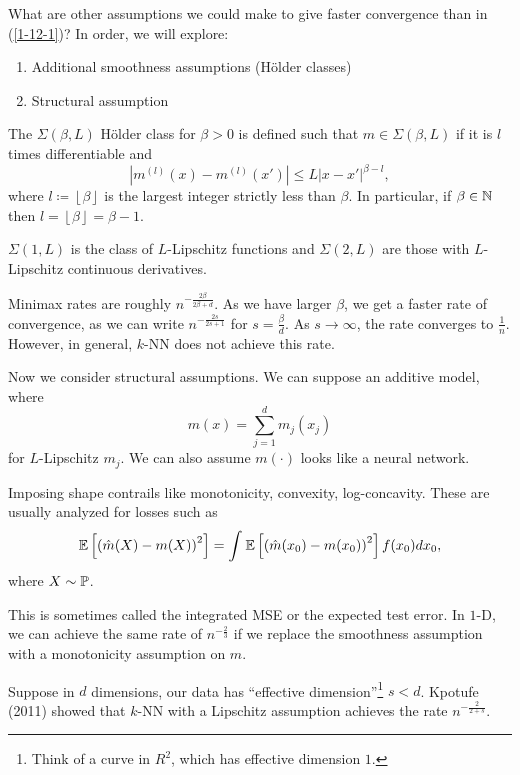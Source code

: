 What are other assumptions we could make to give faster convergence than in (\ref{1-12-1})? 
In order, we will explore:
\begin{enumerate}[label=(\roman*)]
	\item Additional smoothness assumptions (H\"older classes)
	\item Structural assumption
\end{enumerate}

\begin{definition}
	The $\Sigma (\beta, L)$ H\"older class for $\beta > 0$ is defined such that $m \in \Sigma(\beta,L)$ if it is $l$ times differentiable and \[
		\left| m^{(l)}(x) - m^{(l)}(x') \right| \le L \left| x-x' \right|^{\beta-l}
	,\] 
	where $l \coloneqq \left\lfloor \beta \right\rfloor$ is the largest integer strictly less than $\beta.$ In particular, if $\beta \in \N$ then $l = \left\lfloor \beta \right\rfloor = \beta-1$.
\end{definition}

\begin{remark}	$\Sigma(1,L)$ is the class of $L$-Lipschitz functions and $\Sigma(2,L)$ are those with $L$-Lipschitz continuous derivatives.
\end{remark}
\begin{remark}	Minimax rates are roughly $n^{- \frac{2\beta}{2\beta + d}}$. As we have larger $\beta$, we get a faster rate of convergence, as we can write $n^{- \frac{2s}{2s + 1}}$ for $s = \frac{\beta}{d}$. As $s \to \infty$, the rate converges to $\frac{1}{n}$. However, in general, $k$-NN does not achieve this rate.
\end{remark}

Now we consider structural assumptions.
We can suppose an additive model, where \[
	m(x) = \sum\limits_{j=1}^{d} m_j(x_j)
\] for $L$-Lipschitz $m_j$. We can also assume $m(\cdot )$ looks like a neural network. 

Imposing shape contrails like monotonicity, convexity, log-concavity. These are usually analyzed for losses such as \[
	\E\left[\left( \hat{m}(X) - m(X) \right)^2\right] = \int_{}^{} \E\left[\left( \hat{m}(x_0) - m(x_0) \right)^2\right] f(x_0)dx_0 
,\] where $X \sim \P$.

This is sometimes called the integrated MSE or the expected test error. In $1$-D, we can achieve the same rate of $n^{-\frac{2}{3}}$ if we replace the smoothness assumption with a monotonicity assumption on $m$.

\begin{definition}
	Suppose in $d$ dimensions, our data has ``effective dimension''\footnote{Think of a curve in $R^2$, which has effective dimension $1$.} $s < d$. Kpotufe (2011) showed that $k$-NN with a Lipschitz assumption achieves the rate $n^{-\frac{2}{2+s}}$.
\end{definition}


